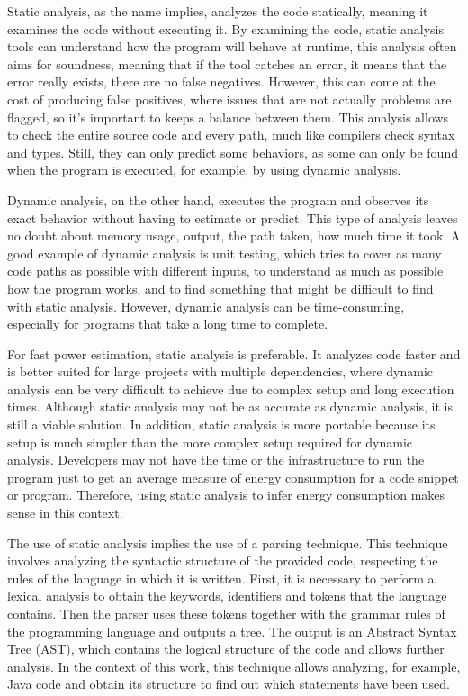 \documentclass[sigplan]{acmart}
\begin{document}
Static analysis, as the name implies, analyzes the code statically, meaning it examines the code without executing it. By examining the code, static analysis tools can understand how the program will behave at runtime\cite{ernst2003static}, this analysis often aims for soundness, meaning that if the tool catches an error, it means that the error really exists, there are no false negatives. However, this can come at the cost of producing false positives, where issues that are not actually problems are flagged, so it's important to keeps a balance between them. This analysis allows to check the entire source code and every path, much like compilers check syntax and types. Still, they can only predict some behaviors, as some can only be found when the program is executed, for example, by using dynamic analysis.

Dynamic analysis, on the other hand, executes the program and observes its exact behavior without having to estimate or predict. This type of analysis leaves no doubt about memory usage, output, the path taken, how much time it took\cite{ernst2003static}. A good example of dynamic analysis is unit testing, which tries to cover as many code paths as possible with different inputs, to understand as much as possible how the program works, and to find something that might be difficult to find with static analysis. However, dynamic analysis can be time-consuming, especially for programs that take a long time to complete.

For fast power estimation, static analysis is preferable. It analyzes code faster and is better suited for large projects with multiple dependencies, where dynamic analysis can be very difficult to achieve due to complex setup and long execution times. Although static analysis may not be as accurate as dynamic analysis, it is still a viable solution. In addition, static analysis is more portable because its setup is much simpler than the more complex setup required for dynamic analysis.
Developers may not have the time or the infrastructure to run the program just to get an average measure of energy consumption for a code snippet or program. Therefore, using static analysis to infer energy consumption makes sense in this context.

The use of static analysis implies the use of a parsing technique. This technique involves analyzing the syntactic structure of the provided code, respecting the rules of the language in which it is written. First, it is necessary to perform a lexical analysis to obtain the keywords, identifiers and tokens that the language contains. Then the parser uses these tokens together with the grammar rules of the programming language and outputs a tree. The output is an Abstract Syntax Tree (AST), which contains the logical structure of the code and allows further analysis. In the context of this work, this technique allows analyzing, for example, Java code and obtain its structure to find out which statements have been used.
\end{document}
